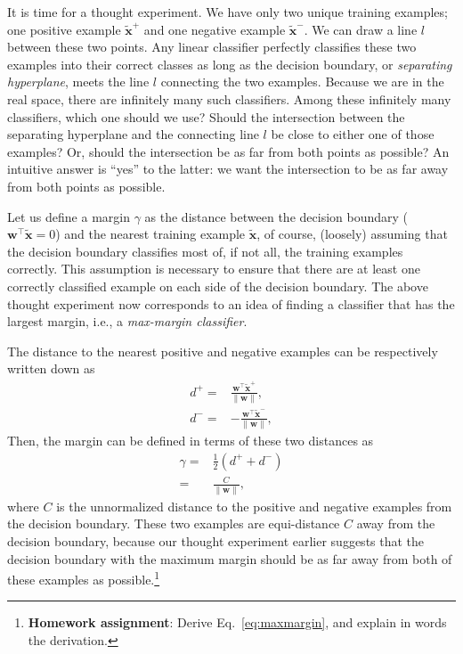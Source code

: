\documentclass{report}
\newcommand{\vect}[1]{\mathbf{#1}}
\newcommand{\vx}[0]{\vect{x}}
\newcommand{\vw}[0]{\vect{w}}
\begin{document}
It is time for a thought experiment. We have only two unique training examples;
one positive example $\tilde{\vx}^+$ and one negative example $\tilde{\vx}^-$.
We can draw a line $l$ between these two points.  Any linear classifier
perfectly classifies these two examples into their correct classes as long as
the decision boundary, or {\it separating hyperplane}, meets the line $l$
connecting the two examples.  Because we are in the real space, there are
infinitely many such classifiers.  Among these infinitely many classifiers,
which one should we use? Should the intersection between the separating
hyperplane and the connecting line $l$ be close to either one of those examples?
Or, should the intersection be as far from both points as possible? An intuitive
answer is ``yes'' to the latter: we want the intersection to be as far away from
both points as possible. 

Let us define a margin $\gamma$ as the distance between the decision boundary
($\vw^\top \tilde{\vx} = 0$) and the nearest training example $\tilde{\vx}$, of
course, (loosely) assuming that the decision boundary classifies most of, if not
all, the training examples correctly. This assumption is necessary to ensure
that there are at least one correctly classified example on each side of the
decision boundary.  The above thought experiment now corresponds to an idea of
finding a classifier that has the largest margin, i.e., a {\it max-margin
classifier}. 

The distance to the nearest positive and negative examples can be respectively
written down as 
\begin{align*}
    d^+ =& \frac{\vw^\top \tilde{\vx}^+}{\| \vw \|}, \\
    d^- =& -\frac{\vw^\top \tilde{\vx}^-}{\| \vw \|}, 
\end{align*}
Then, the margin can be defined in terms of these two distances as
\begin{align}
    \label{eq:maxmargin}
    \gamma =& \frac{1}{2} (d^+ + d^-) \\
    =& \frac{C}{\|\vw\|},
\end{align}
where $C$ is the unnormalized distance to the positive and negative examples
from the decision boundary. These two examples are equi-distance $C$ away from
the decision boundary, because our thought experiment earlier suggests that the
decision boundary with the maximum margin should be as far away from both of
these examples as possible.\footnote{
    {\bf Homework assignment}: Derive Eq.~\eqref{eq:maxmargin}, and explain in
    words the derivation. 
}
\end{document}
